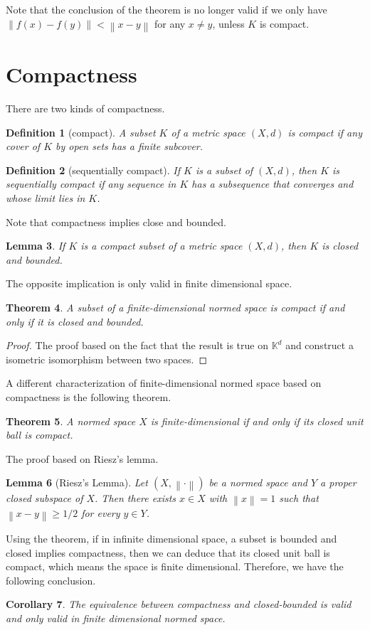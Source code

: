\documentclass[12pt,a4paper]{article}
\numberwithin{equation}{section}
\theoremstyle{mystyle}
\newtheorem{definition}{Definition}[section]
\newtheorem{theorem}[definition]{Theorem}
\newtheorem{lemma}[definition]{Lemma}
\newtheorem{corollary}[definition]{Corollary}
\newcommand{\K}{\mathbb{K}}
\newcommand{\norm}[1]{\left\lVert #1 \right\rVert}
\begin{document}
	
	Note that the conclusion of the theorem is no longer valid if we only have $\norm{f(x)-f(y)}<\norm{x-y}$ for any $x\neq y$, unless $K$ is compact.
	
	\section{Compactness}
	There are two kinds of compactness. 
	\begin{definition}[compact]
		A subset $K$ of a metric space $(X,d)$ is \emph{compact} if any cover of $K$ by open sets has a finite subcover.
	\end{definition}
	\begin{definition}[sequentially compact]
		If $K$ is a subset of $(X,d)$, then $K$ is \emph{sequentially compact} if any sequence in $K$ has a subsequence that converges and whose limit lies in $K$.
	\end{definition}
	
	Note that compactness implies close and bounded. 
	\begin{lemma}
		If $K$ is a compact subset of a metric space $(X,d)$, then $K$ is closed and bounded.
	\end{lemma}
	The opposite implication is only valid in finite dimensional space.
	\begin{theorem}
		A subset of a finite-dimensional normed space is compact if and only if it is closed and bounded.
	\end{theorem}
	\begin{proof}
		The proof based on the fact that the result is true on $\K^d$ and construct a isometric isomorphism between two spaces.
	\end{proof}
	A different characterization of finite-dimensional normed space based on compactness is the following theorem.
	\begin{theorem}
		A normed space $X$ is finite-dimensional if and only if its closed unit ball is compact.
	\end{theorem}
	The proof based on Riesz's lemma.
	\begin{lemma}[Riesz's Lemma]
		Let $(X,\norm{\cdot})$ be a normed space and $Y$ a proper closed subspace of $X$. Then there exists $x\in X$ with $\norm{x}=1$ such that $\norm{x-y}\geq 1/2$ for every $y\in Y$.
	\end{lemma}

	Using the theorem, if in infinite dimensional space, a subset is bounded and closed implies compactness, then we can deduce that its closed unit ball is compact, which means the space is finite dimensional. Therefore, we have the following conclusion.
	\begin{corollary}
		The equivalence between compactness and closed-bounded is valid and only valid in finite dimensional normed space.
	\end{corollary}
	
\end{document}
